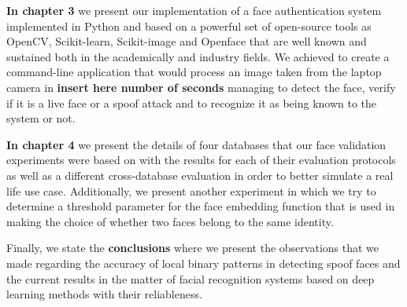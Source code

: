 \textbf{In chapter 3} we present our implementation of a face authentication system implemented in Python and based on a powerful set of open-source tools as OpenCV\cite{opencv_library}, Scikit-learn\cite{scikit-learn}, Scikit-image\cite{scikit-image} and Openface\cite{amos2016openface} that are well known and sustained both in the academically and industry fields. We achieved to create a command-line application that would process an image taken from the laptop camera in \textbf{insert here number of seconds} managing to detect the face, verify if it is a live face or a spoof attack and to recognize it as being known to the system or not.

\textbf{In chapter 4} we present the details of four databases that our face validation experiments were based on with the results for each of their evaluation protocols as well as a different cross-database evaluation in order to better simulate a real life use case. Additionally, we present another experiment in which we try to determine a threshold parameter for the face embedding function that is used in making the choice of whether two faces belong to the same identity.

Finally, we state the \textbf{conclusions} where we present the observations that we made regarding the accuracy of local binary patterns in detecting spoof faces and the current results in the matter of facial recognition systems based on deep learning methods with their reliableness.
